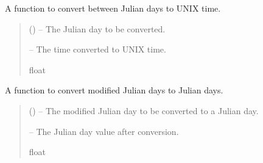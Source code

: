 \documentclass[letterpaper,11pt,english]{sphinxmanual}
\begin{document}
\begin{savenotes}\begin{fulllineitems}
\label{\detokenize{code/opihiexarata.library.conversion:opihiexarata.library.conversion.julian_day_to_unix_time}}
\pysigstartsignatures
{}
\pysigstopsignatures
\sphinxAtStartPar
A function to convert between Julian days to UNIX time.
\begin{quote}\begin{description}
\sphinxAtStartPar
{} () – The Julian day to be converted.

\sphinxAtStartPar
{} – The time converted to UNIX time.

\sphinxAtStartPar
float

\end{description}\end{quote}

\end{fulllineitems}\end{savenotes}


\begin{savenotes}\begin{fulllineitems}
\label{\detokenize{code/opihiexarata.library.conversion:opihiexarata.library.conversion.modified_julian_day_to_julian_day}}
\pysigstartsignatures
{}
\pysigstopsignatures
\sphinxAtStartPar
A function to convert modified Julian days to Julian days.
\begin{quote}\begin{description}
\sphinxAtStartPar
{} () – The modified Julian day to be converted to a Julian day.

\sphinxAtStartPar
{} – The Julian day value after conversion.

\sphinxAtStartPar
float

\end{description}\end{quote}

\end{fulllineitems}\end{savenotes}
\end{document}
